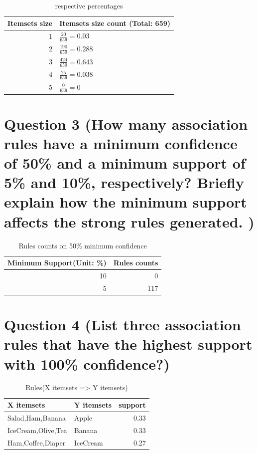 \documentclass[titlepage]{article}
\begin{document}
\begin{table}[htbp]
\caption{\label{tab:orgee0727c}
respective percentages}
\centering
\begin{tabular}{rl}
Itemsets size & Itemsets size count (Total: 659)\\
\hline
1 & \(\frac{20}{659} = 0.03\)\\
2 & \(\frac{190}{659} = 0.288\)\\
3 & \(\frac{424}{659} = 0.643\)\\
4 & \(\frac{25}{659} = 0.038\)\\
5 & \(\frac{0}{659} = 0\)\\
\end{tabular}
\end{table}
\section{Question 3 (How many association rules have a minimum confidence of 50\% and a minimum support of 5\% and 10\%, respectively? Briefly explain how the minimum support affects the strong rules generated. )}
\label{sec:org3f87eaf}

\begin{table}[htbp]
\caption{\label{tab:org9811961}
Rules counts on 50\% minimum confidence}
\centering
\begin{tabular}{rr}
Minimum Support(Unit: \%) & Rules counts\\
\hline
10 & 0\\
5 & 117\\
\end{tabular}
\end{table}

\section{Question 4 (List three association rules that have the highest support with 100\% confidence?)}
\label{sec:org96c0763}

\begin{table}[htbp]
\caption{\label{tab:org631ea84}
Rules(X itemsets => Y itemsets)}
\centering
\begin{tabular}{llr}
X itemsets & Y itemsets & support\\
\hline
Salad,Ham,Banana & Apple & 0.33\\
IceCream,Olive,Tea & Banana & 0.33\\
Ham,Coffee,Diaper & IceCream & 0.27\\
\end{tabular}
\end{table}
\end{document}
